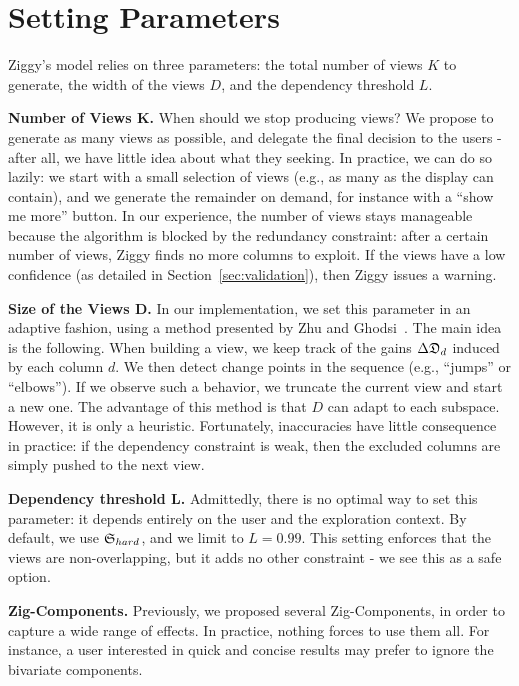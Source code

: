 \section{Setting Parameters}
\label{sec:parameters}

Ziggy's model relies on three parameters: the total number of views $K$ to
generate, the width of the views $D$, and the dependency threshold $L$. 

\textbf{Number of Views K.} When should we stop producing views? We propose to
generate as many views as possible, and delegate the final decision to the
users - after all, we have little idea about what they seeking. In practice, we
can do so lazily: we start with a small selection of views (e.g., as many as
the display can contain), and we generate the remainder on demand, for instance
with a ``show me more'' button.  In our experience, the number of views stays
manageable because the algorithm is blocked by the redundancy constraint: after
a certain number of views, Ziggy finds no more columns to exploit. If the views
have a low confidence (as detailed in Section~\ref{sec:validation}), then Ziggy
issues a warning.

\textbf{Size of the Views D.} In our implementation, we set this parameter in an adaptive
fashion, using a method presented by Zhu and Ghodsi~\cite{zhu2006automatic}.
The main idea is the following. When building a view, we keep track of the
gains $\Delta\mathfrak{D}_d$ induced by each column $d$.  We then detect change
points in the sequence (e.g., ``jumps'' or ``elbows'').  If we observe such a
behavior, we truncate the current view and start a new one.  The advantage of
this method is that $D$ can adapt to each subspace. However, it is
only a heuristic. Fortunately, inaccuracies have little consequence in
practice: if the dependency constraint is weak, then the excluded columns are
simply pushed to the next view.

\textbf{Dependency threshold L.} Admittedly, there is no optimal way to set
this parameter: it depends entirely on the user and the exploration context. By
default, we use $\mathfrak{S}_{hard}$, and we limit to $L=0.99$. This setting
enforces that the views are non-overlapping, but it adds no other constraint -
we see this as a safe option.

\textbf{Zig-Components.} Previously, we proposed several Zig-Components, in
order to capture a wide range of effects. In practice, nothing forces to use
them all. For instance, a user interested in quick and concise results may
prefer to ignore the bivariate components.


